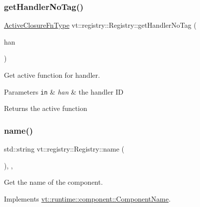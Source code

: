 \subsubsection{\texorpdfstring{get\+Handler\+No\+Tag()}{getHandlerNoTag()}}
{\footnotesize\ttfamily \hyperlink{namespacevt_a2a06c34cafcd511828f16cbf1476b924}{Active\+Closure\+Fn\+Type} vt\+::registry\+::\+Registry\+::get\+Handler\+No\+Tag (\begin{DoxyParamCaption}\item[{\hyperlink{namespacevt_af64846b57dfcaf104da3ef6967917573}{Handler\+Type} const}]{han }\end{DoxyParamCaption})}



Get active function for handler. 


\begin{DoxyParams}[1]{Parameters}
\mbox{\tt in}  & {\em han} & the handler ID\\
\hline
\end{DoxyParams}
\begin{DoxyReturn}{Returns}
the active function 
\end{DoxyReturn}
\mbox{\label{structvt_1_1registry_1_1_registry_a8488eb3ab95e207094617027bb5c75c9}} 
\subsubsection{\texorpdfstring{name()}{name()}}
{\footnotesize\ttfamily std\+::string vt\+::registry\+::\+Registry\+::name (\begin{DoxyParamCaption}{ }\end{DoxyParamCaption})\hspace{0.3cm}{\ttfamily [inline]}, {\ttfamily [override]}, {\ttfamily [virtual]}}



Get the name of the component. 



Implements \hyperlink{structvt_1_1runtime_1_1component_1_1_component_name_a33c06229bb605a2b2ceff68830d6d773}{vt\+::runtime\+::component\+::\+Component\+Name}.

\mbox{\label{structvt_1_1registry_1_1_registry_ad4fdbf2cfbe4e852c5556435efe4255f}} 
